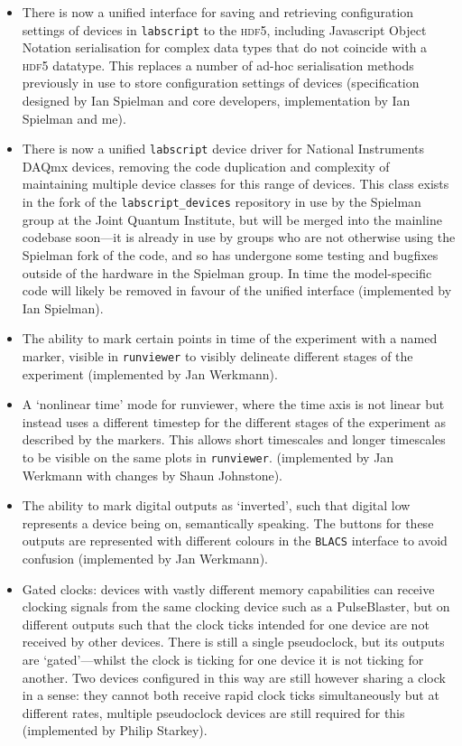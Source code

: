 \begin{itemize}
    \item There is now a unified interface for saving and retrieving configuration settings of devices in \texttt{labscript} to the \textsc{hdf5}, including Javascript Object Notation serialisation for complex data types that do not coincide with a \textsc{hdf5} datatype. This replaces a number of ad-hoc serialisation methods previously in use to store configuration settings of devices (specification designed by Ian Spielman and core developers, implementation by Ian Spielman and me).
    
    \item There is now a unified \texttt{labscript} device driver for National Instruments DAQmx devices, removing the code duplication and complexity of maintaining multiple device classes for this range of devices. This class exists in the fork of the \texttt{labscript\_devices} repository in use by the Spielman group at the Joint Quantum Institute, but will be merged into the mainline codebase soon---it is already in use by groups who are not otherwise using the Spielman fork of the code, and so has undergone some testing and bugfixes outside of the hardware in the Spielman group. In time the model-specific code will likely be removed in favour of the unified interface (implemented by Ian Spielman).
    
    \item The ability to mark certain points in time of the experiment with a named marker, visible in \texttt{runviewer} to visibly delineate different stages of the experiment (implemented by Jan Werkmann).
    
    \item A `nonlinear time' mode for runviewer, where the time axis is not linear but instead uses a different timestep for the different stages of the experiment as described by the markers. This allows short timescales and longer timescales to be visible on the same plots in \texttt{runviewer}. (implemented by Jan Werkmann with changes by Shaun Johnstone).
    
    \item The ability to mark digital outputs as `inverted', such that digital low represents a device being on, semantically speaking. The buttons for these outputs are represented with different colours in the \texttt{BLACS} interface to avoid confusion (implemented by Jan Werkmann).
    
    \item Gated clocks: devices with vastly different memory capabilities can receive clocking signals from the same clocking device such as a PulseBlaster, but on different outputs such that the clock ticks intended for one device are not received by other devices. There is still a single pseudoclock, but its outputs are `gated'---whilst the clock is ticking for one device it is not ticking for another. Two devices configured in this way are still however sharing a clock in a sense: they cannot both receive rapid clock ticks simultaneously but at different rates, multiple pseudoclock devices are still required for this (implemented by Philip Starkey).
    

\end{itemize}

